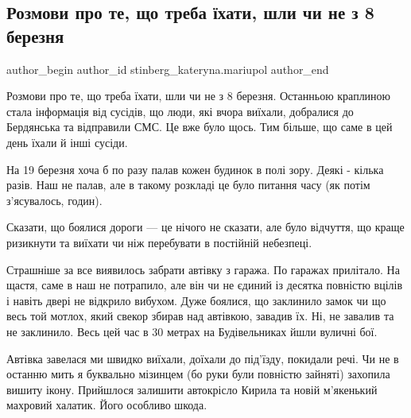  
 
 
 
 

\subsection{Розмови про те, що треба їхати, шли чи не з 8 березня}
\label{sec:20_03_2023.fb.stinberg_kateryna.mariupol.1.rozmovi_pro_te__shch}

\ifcmt
 author_begin
   author_id stinberg_kateryna.mariupol
 author_end
\fi

Розмови про те, що треба їхати, шли чи не з 8 березня. Останньою краплиною
стала інформація від сусідів, що люди, які вчора виїхали, добралися до
Бердянська та відправили СМС. Це вже було щось. Тим більше, що саме в цей день
їхали й інші сусіди.

На 19 березня хоча б по разу палав кожен будинок в полі зору. Деякі - кілька
разів. Наш не палав, але в такому розкладі це було питання часу (як потім
з'ясувалось, годин).

Сказати, що боялися дороги — це нічого не сказати, але було відчуття, що краще
ризикнути та виїхати чи ніж перебувати в постійній небезпеці. 

Страшніше за все виявилось забрати автівку з гаража. По гаражах прилітало. На
щастя, саме в наш не потрапило, але він чи не єдиний із десятка повністю вцілів
і навіть двері не відкрило вибухом. Дуже боялися, що заклинило замок чи що весь
той мотлох, який свекор збирав над автівкою, завадив їх. Ні, не завалив та не
заклинило. Весь цей час в 30 метрах на Будівельниках йшли вуличні бої. 

Автівка завелася ми швидко виїхали, доїхали до під'їзду, покидали речі. Чи не в
останню мить я буквально мізинцем (бо руки були повністю зайняті) захопила
вишиту ікону. Прийшлося залишити автокрісло Кирила та новій м'якенький махровий
халатик. Його особливо шкода. 

